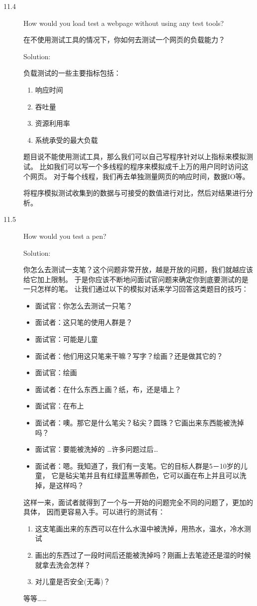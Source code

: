 \begin{description}
\item[11.4] How would you load test a webpage without using any test tools?

在不使用测试工具的情况下，你如何去测试一个网页的负载能力？

Solution:

负载测试的一些主要指标包括：
\begin{enumerate}
    \itemsep=-3pt
\item 响应时间
\item 吞吐量
\item 资源利用率
\item 系统承受的最大负载
\end{enumerate}
题目说不能使用测试工具，那么我们可以自己写程序针对以上指标来模拟测试。 比如我们可以写一个多线程的程序来模拟成千上万的用户同时访问这个网页。 对于每个线程，我们再去单独测量网页的响应时间，数据IO等。

将程序模拟测试收集到的数据与可接受的数值进行对比，然后对结果进行分析。

%


\item[11.5] How would you test a pen?

Solution: 

你怎么去测试一支笔？这个问题非常开放，越是开放的问题，我们就越应该给它加上限制。 于是你应该不断地问面试官问题来确定你到底要测试的是一只怎样的笔。 让我们通过以下的模拟对话来学习回答这类题目的技巧：
\begin{itemize}
    \itemsep=-3pt
\item 面试官：你怎么去测试一只笔？
\item 面试者：这只笔的使用人群是？
\item 面试官：可能是儿童
\item 面试者：他们用这只笔来干嘛？写字？绘画？还是做其它的？
\item 面试官：绘画
\item 面试者：在什么东西上画？纸，布，还是墙上？
\item 面试官：在布上
\item 面试者：噢。那它是什么笔尖？毡尖？圆珠？它画出来东西能被洗掉吗？
\item 面试官：要能被洗掉的 …许多问题过后…
\item 面试者：嗯。我知道了，我们有一支笔。它的目标人群是5－10岁的儿童， 它是毡尖笔并且有红绿蓝黑等颜色，它可以画在布上并且可以洗掉，是这样吗？
\end{itemize}
这样一来，面试者就得到了一个与一开始的问题完全不同的问题了，更加的具体， 因而更容易入手。可以进行的测试有：
\begin{enumerate}
    \itemsep=-3pt
\item 这支笔画出来的东西可以在什么水温中被洗掉，用热水，温水，冷水测试
\item 画出的东西过了一段时间后还能被洗掉吗？刚画上去笔迹还是湿的时候就拿去洗会怎样？
\item 对儿童是否安全(无毒)？
\end{enumerate}
等等……


\end{description}
